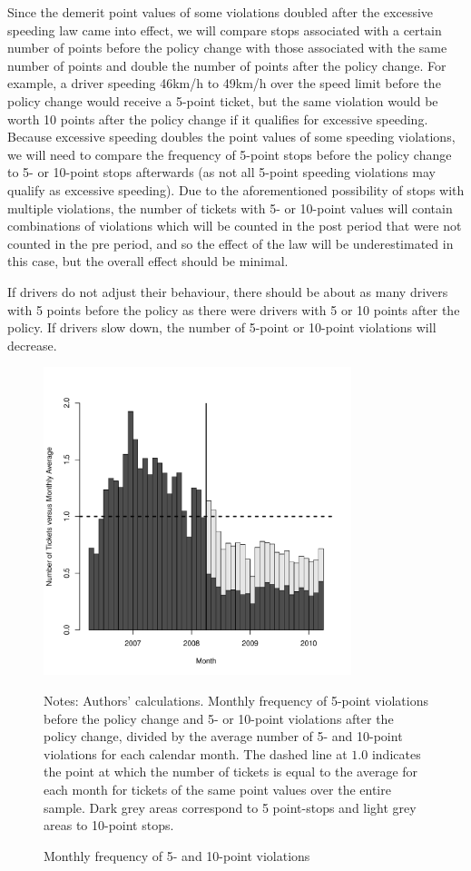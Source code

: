 Since the demerit point values of some violations doubled 
after the excessive speeding law came into effect, 
% 
we will compare stops associated with a certain number of points 
before the policy change with those associated with the 
same number of points and double the number of points after the policy change. 
For example, a driver speeding 46km/h to 49km/h over the speed limit 
before the policy change would receive a 5-point ticket, 
but the same violation would be worth 10 points after the policy change 
if it qualifies for excessive speeding. 
Because excessive speeding doubles the point values of some speeding violations, 
we will need to compare the frequency of 5-point stops before the policy change 
to 5- or 10-point stops afterwards 
(as not all 5-point speeding violations may qualify as excessive speeding). 
Due to the aforementioned possibility of stops with multiple violations, 
the number of tickets with 5- or 10-point values will contain 
combinations of violations which will be counted in the post period 
that were not counted in the pre period, and so the effect of the law 
will be underestimated in this case, but the overall effect should be minimal.

If drivers do not adjust their behaviour, 
there should be about as many drivers with 5 points before the policy 
as there were drivers with 5 or 10 points after the policy. 
If drivers slow down, the number of 5-point or 10-point violations will decrease. 


\begin{figure}
\centering
\includegraphics[width=0.8\textwidth]{Figures/num_pts_5_10_all}
\caption{Monthly frequency of 5- and 10-point violations }
Notes: Authors' calculations. 
Monthly frequency of 5-point violations before the policy change 
and 5- or 10-point violations after the policy change, 
divided by the average number of 5- and 10-point violations
for each calendar month. 
% 
The dashed line at $1.0$ indicates the point at which 
the number of tickets is equal to the average for each month 
for tickets of the same point values over the entire sample.
% 
Dark grey areas correspond to 5 point-stops and light grey areas to 10-point stops.
\label{fig:num_pts_5_10_all}
\end{figure}


